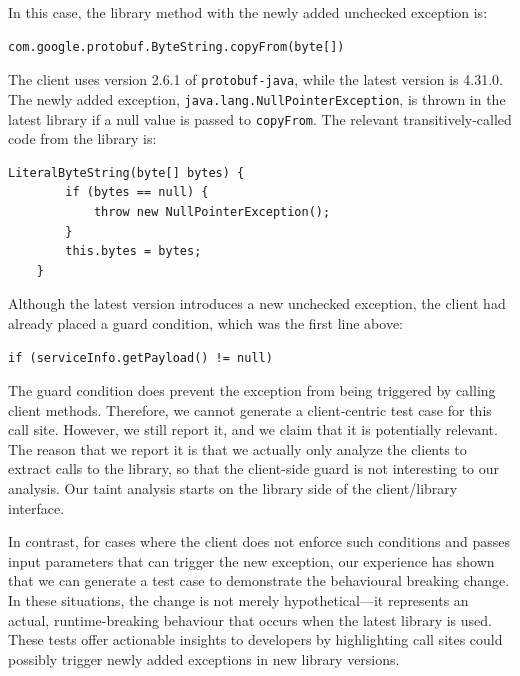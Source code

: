 In this case, the library method with the newly added unchecked exception is:

\begin{lstlisting}[style=javacode]
    com.google.protobuf.ByteString.copyFrom(byte[])
\end{lstlisting}

The client uses version 2.6.1 of \texttt{protobuf-java}, while the latest version is 4.31.0. The newly added exception, \texttt{java.lang.NullPointerException}, is thrown in the latest library if a null value is passed to \texttt{copyFrom}. The relevant transitively-called code from the library is:

\begin{lstlisting}[style=javacode]
    LiteralByteString(byte[] bytes) {
        if (bytes == null) {
            throw new NullPointerException();
        }
        this.bytes = bytes;
    }
\end{lstlisting}

Although the latest version introduces a new unchecked exception, the client had already placed a guard condition, which was the first line above:

\begin{lstlisting}[style=javacode]
  if (serviceInfo.getPayload() != null)
\end{lstlisting}

The guard condition does prevent the exception from being triggered by calling client methods. Therefore, we cannot generate a client-centric test case for this call site. However, we still report it, and we claim that it is potentially relevant. The reason that we report it is that we actually only analyze the clients to extract calls to the library, so that the client-side guard is not interesting to our analysis. Our taint analysis starts on the library side of the client/library interface.

In contrast, for cases where the client does not enforce such conditions and passes input parameters that can trigger the new exception, our experience has shown that we can generate a test case to demonstrate the behavioural breaking change. In these situations, the change is not merely hypothetical—it represents an actual, runtime-breaking behaviour that occurs when the latest library is used. These tests offer actionable insights to developers by highlighting call sites could possibly trigger newly added exceptions in new library versions.


